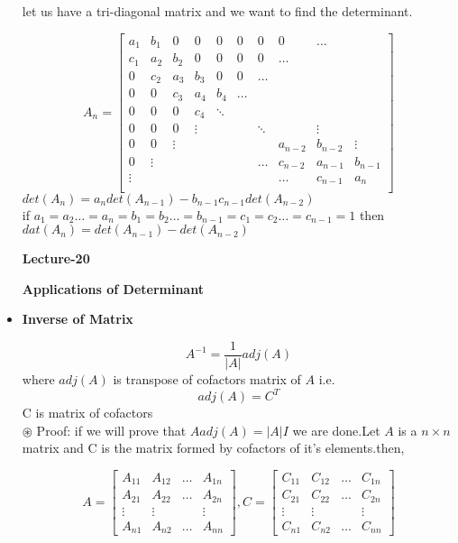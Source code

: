 \documentclass[a4paper,11pt]{article}
\numberwithin{equation}{section}
\begin{document}
\begin{itemize}
let us have a tri-diagonal matrix and we want to find the determinant.
\begin{center}
    \[A_n=
    \begin{bmatrix}
        a_1&b_1&0&0&0&0&0&0&\dots\\
        c_1&a_2&b_2&0&0&0&0&\dots\\
        0&c_2&a_3&b_3&0&0&\dots\\
        0&0&c_3&a_4&b_4&\dots\\
        0&0&0&c_4&\ddots\\
        0&0&0&\vdots&&&\ddots&&\vdots&\\
        0&0&\vdots&&&&&a_{n-2}&b_{n-2}&\vdots\\
        0&\vdots&&&&&\dots&c_{n-2}&a_{n-1}&b_{n-1}\\
        \vdots&&&&&&&\dots&c_{n-1}&a_n\\
    \end{bmatrix}
    \]
    $det(A_n)=a_ndet(A_{n-1})-b_{n-1}c_{n-1}det(A_{n-2})$\\
    \vspace{4pt}
    if $a_1=a_2\dots =a_n=b_1=b_2\dots =b_{n-1}=c_1=c_2\dots=c_{n-1}=1$ then\\ \vspace{4pt}
    $dat(A_n)=det(A_{n-1})-det(A_{n-2})$
\end{center}

\begin{center}
    \Huge{\textbf{Lecture-20}}
\end{center}
\vspace{5pt}

\textbf{Applications of Determinant}\\
\item \textbf{Inverse of Matrix}

\begin{equation}
    A^{-1}=\frac{1}{\vert A\vert}adj(A)
\end{equation}
where $adj(A)$ is transpose of cofactors matrix of $A$ i.e.
\begin{equation}
    adj(A)=C^T
\end{equation}
C is matrix of cofactors \\

$\circledast$ Proof: if we will prove that $Aadj(A)=\vert A\vert I$ we are done.Let $A$ is a $n\times n$ matrix and C is the matrix formed by cofactors of it's elements.then,
\begin{center}
    \[A=
    \begin{bmatrix}
        A_{11}&A_{12}&\dots&A_{1n}\\
        A_{21}&A_{22}&\dots&A_{2n}\\
        \vdots&\vdots&&\vdots\\
        A_{n1}&A_{n2}&\dots&A_{nn}
    \end{bmatrix},
    C=\begin{bmatrix}
        C_{11}&C_{12}&\dots&C_{1n}\\
        C_{21}&C_{22}&\dots&C_{2n}\\
        \vdots&\vdots&&\vdots\\
        C_{n1}&C_{n2}&\dots&C_{nn}
    \end{bmatrix}
    \]


\end{center}
\end{itemize}
\end{document}
